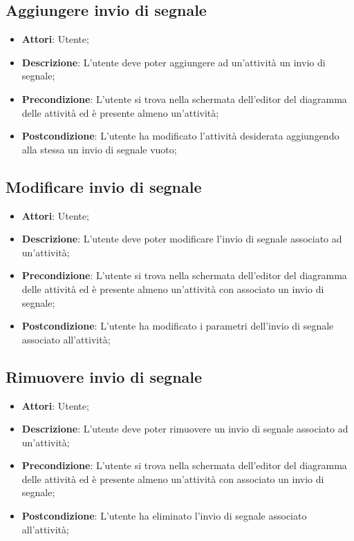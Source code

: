 \documentclass[../AnalisiDeiRequisiti.tex]{subfiles}
\begin{document}
	\subsection{Aggiungere invio di segnale}
	\begin{itemize}
		\item \textbf{Attori}: Utente;
		\item \textbf{Descrizione}: L'utente deve poter aggiungere ad un'attività un invio di segnale;
		\item \textbf{Precondizione}: L'utente si trova nella schermata dell'editor del diagramma delle attività ed è presente almeno un'attività;
		\item \textbf{Postcondizione}: L'utente ha modificato l'attività desiderata aggiungendo alla stessa un invio di segnale vuoto;
	\end{itemize}
	
	\subsection{Modificare invio di segnale}
	\begin{itemize}
		\item \textbf{Attori}: Utente;
		\item \textbf{Descrizione}: L'utente deve poter modificare l'invio di segnale associato ad un'attività;
		\item \textbf{Precondizione}: L'utente si trova nella schermata dell'editor del diagramma delle attività ed è presente almeno un'attività con associato un invio di segnale;
		\item \textbf{Postcondizione}: L'utente ha modificato i parametri dell'invio di segnale associato all'attività;
	\end{itemize}
	
	\subsection{Rimuovere invio di segnale}
	\begin{itemize}
		\item \textbf{Attori}: Utente;
		\item \textbf{Descrizione}: L'utente deve poter rimuovere un invio di segnale associato ad un'attività;
		\item \textbf{Precondizione}: L'utente si trova nella schermata dell'editor del diagramma delle attività ed è presente almeno un'attività con associato un invio di segnale;
		\item \textbf{Postcondizione}: L'utente ha eliminato l'invio di segnale associato all'attività;
	\end{itemize}
	
\end{document}
